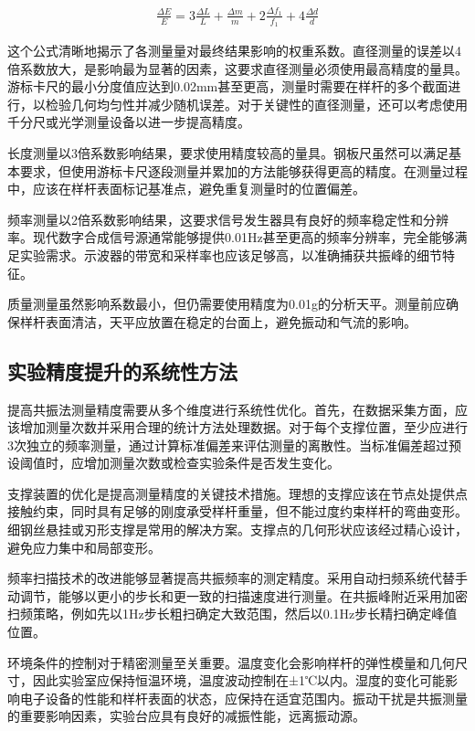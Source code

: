 ﻿\documentclass[12pt,a4paper]{article}
\begin{document}
\begin{align}
\frac{\Delta E}{E} = 3\frac{\Delta L}{L} + \frac{\Delta m}{m} + 2\frac{\Delta f_1}{f_1} + 4\frac{\Delta d}{d} \tag{24}
\end{align}

这个公式清晰地揭示了各测量量对最终结果影响的权重系数。直径测量的误差以4倍系数放大，是影响最为显著的因素，这要求直径测量必须使用最高精度的量具。游标卡尺的最小分度值应达到0.02mm甚至更高，测量时需要在样杆的多个截面进行，以检验几何均匀性并减少随机误差。对于关键性的直径测量，还可以考虑使用千分尺或光学测量设备以进一步提高精度。

长度测量以3倍系数影响结果，要求使用精度较高的量具。钢板尺虽然可以满足基本要求，但使用游标卡尺逐段测量并累加的方法能够获得更高的精度。在测量过程中，应该在样杆表面标记基准点，避免重复测量时的位置偏差。

频率测量以2倍系数影响结果，这要求信号发生器具有良好的频率稳定性和分辨率。现代数字合成信号源通常能够提供0.01Hz甚至更高的频率分辨率，完全能够满足实验需求。示波器的带宽和采样率也应该足够高，以准确捕获共振峰的细节特征。

质量测量虽然影响系数最小，但仍需要使用精度为0.01g的分析天平。测量前应确保样杆表面清洁，天平应放置在稳定的台面上，避免振动和气流的影响。

\subsection{实验精度提升的系统性方法}

提高共振法测量精度需要从多个维度进行系统性优化。首先，在数据采集方面，应该增加测量次数并采用合理的统计方法处理数据。对于每个支撑位置，至少应进行3次独立的频率测量，通过计算标准偏差来评估测量的离散性。当标准偏差超过预设阈值时，应增加测量次数或检查实验条件是否发生变化。

支撑装置的优化是提高测量精度的关键技术措施。理想的支撑应该在节点处提供点接触约束，同时具有足够的刚度承受样杆重量，但不能过度约束样杆的弯曲变形。细钢丝悬挂或刃形支撑是常用的解决方案。支撑点的几何形状应该经过精心设计，避免应力集中和局部变形。

频率扫描技术的改进能够显著提高共振频率的测定精度。采用自动扫频系统代替手动调节，能够以更小的步长和更一致的扫描速度进行测量。在共振峰附近采用加密扫频策略，例如先以1Hz步长粗扫确定大致范围，然后以0.1Hz步长精扫确定峰值位置。

环境条件的控制对于精密测量至关重要。温度变化会影响样杆的弹性模量和几何尺寸，因此实验室应保持恒温环境，温度波动控制在±1℃以内。湿度的变化可能影响电子设备的性能和样杆表面的状态，应保持在适宜范围内。振动干扰是共振测量的重要影响因素，实验台应具有良好的减振性能，远离振动源。
\end{document}
